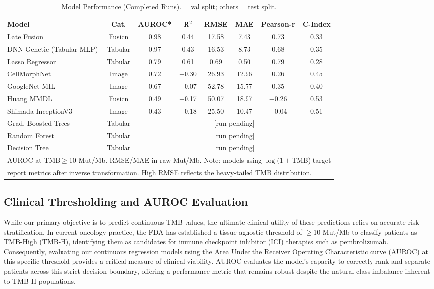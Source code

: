 \documentclass[11pt,a4paper]{article}
\begin{document}
\begin{table}[H]
\centering
\caption{Model Performance (Completed Runs). \textdagger{} = val split; others = test split.}
\small
\begin{tabular}{|l|c|c|c|c|c|c|c|}
\hline
\textbf{Model} & \textbf{Cat.} & \textbf{AUROC*} & \textbf{R$^2$} &
\textbf{RMSE} & \textbf{MAE} & \textbf{Pearson-r} & \textbf{C-Index} \\
\hline
Late Fusion & Fusion & 0.98 & 0.44 & 17.58 & 7.43 & 0.73 & 0.33 \\
DNN Genetic (Tabular MLP) & Tabular & 0.97 & 0.43 & 16.53 & 8.73 & 0.68 & 0.35 \\
Lasso Regressor\textdagger{} & Tabular & 0.79 & 0.61 & 0.69 & 0.50 & 0.79 & 0.28 \\
CellMorphNet & Image & 0.72 & $-$0.30 & 26.93 & 12.96 & 0.26 & 0.45 \\
GoogleNet MIL\textdagger{} & Image & 0.67 & $-$0.07 & 52.78 & 15.77 & 0.35 & 0.40 \\
Huang MMDL\textdagger{} & Fusion & 0.49 & $-$0.17 & 50.07 & 18.97 & $-$0.26 & 0.53 \\
Shimada InceptionV3 & Image & 0.43 & $-$0.18 & 25.50 & 10.47 & $-$0.04 & 0.51 \\
Grad. Boosted Trees & Tabular & \multicolumn{6}{c|}{[run pending]} \\
Random Forest & Tabular & \multicolumn{6}{c|}{[run pending]} \\
Decision Tree & Tabular & \multicolumn{6}{c|}{[run pending]} \\
\hline
\multicolumn{8}{l}{\small * AUROC at TMB$\geq$10 Mut/Mb. RMSE/MAE in raw Mut/Mb. Note: models using $\log(1{+}$TMB) target} \\
\multicolumn{8}{l}{\small report metrics after inverse transformation. High RMSE reflects the heavy-tailed TMB distribution.} \\
\hline
\end{tabular}
\label{tab:leaderboard}
\end{table}

\subsection{Clinical Thresholding and AUROC Evaluation}
\label{subsec:clinical_thresholding}

While our primary objective is to predict continuous TMB values, the ultimate clinical utility of these predictions relies on accurate risk stratification. In current oncology practice, the FDA has established a tissue-agnostic threshold of $\geq$10 Mut/Mb to classify patients as TMB-High (TMB-H), identifying them as candidates for immune checkpoint inhibitor (ICI) therapies such as pembrolizumab. Consequently, evaluating our continuous regression models using the Area Under the Receiver Operating Characteristic curve (AUROC) at this specific threshold provides a critical measure of clinical viability. AUROC evaluates the model's capacity to correctly rank and separate patients across this strict decision boundary, offering a performance metric that remains robust despite the natural class imbalance inherent to TMB-H populations.
\end{document}
